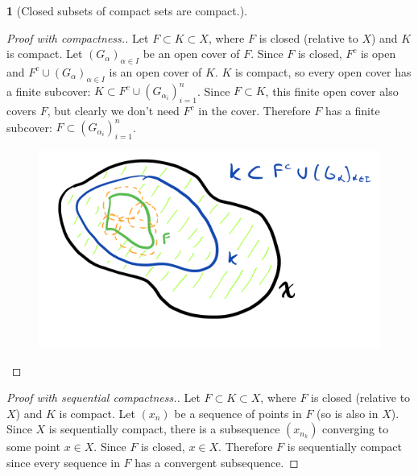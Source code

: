 \documentclass[11pt]{article}
\numberwithin{equation}{section}
\theoremstyle{plain}
\newtheorem{theorem}{\color{ForestGreen}{\textbf{Theorem}}}[section]
\theoremstyle{definition}
\newcommand{\1}{\mathbbm 1}
\begin{document}
\begin{theorem}[Closed subsets of compact sets are compact.]
\end{theorem}
\begin{proof}[Proof with compactness.]
	Let $F \subset K \subset X$, where $F$ is closed (relative to $X$) and $K$ is compact. Let $(G_\alpha)_{\alpha \in I}$ be an open cover of $F$. Since $F$ is closed, $F^c$ is open and $F^c \cup (G_\alpha)_{\alpha \in I}$ is an open cover of $K$. $K$ is compact, so every open cover has a finite subcover: $K \subset F^c \cup (G_{\alpha_i})_{i=1}^n$. Since $F \subset K$, this finite open cover also covers $F$, but clearly we don't need $F^c$ in the cover. Therefore $F$ has a finite subcover: $F \subset (G_{\alpha_i})_{i=1}^n$.

	\begin{figure}[H]
		\begin{center}
			\includegraphics[scale=.45]{closed_subsets_compact.png}
		\end{center}
	\end{figure}
\end{proof}

\begin{proof}[Proof with sequential compactness.]
	Let $F \subset K \subset X$, where $F$ is closed (relative to $X$) and $K$ is compact. Let $(x_n)$ be a sequence of points in $F$ (so is also in $X$). Since $X$ is sequentially compact, there is a subsequence $(x_{n_k})$ converging to some point $x \in X$. Since $F$ is closed, $x \in X$. Therefore $F$ is sequentially compact since every sequence in $F$ has a convergent subsequence. 
\end{proof}
\end{document}
